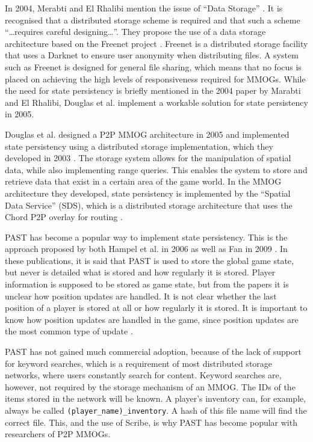 In 2004, Merabti and El Rhalibi mention the issue of ``Data Storage'' \cite{using_freenet_storage}. It is recognised that a distributed storage
scheme is required and that such a scheme ``\ldots requires careful designing\ldots''. They propose the use of a data storage architecture based on
the Freenet project \cite{clarke_freenet}. Freenet is a distributed storage facility that uses a Darknet to ensure user anonymity when distributing
files. A system such as Freenet is designed for general file sharing, which means that no focus is placed on achieving the high levels of
responsiveness required for MMOGs. While the need for state persistency is briefly mentioned in the 2004 paper by Marabti and El Rhalibi, Douglas et
al. implement a workable solution for state persistency in 2005.

Douglas et al. designed a P2P MMOG architecture in 2005 \cite{Douglas05enablingmassively} and implemented state persistency using a distributed
storage implementation, which they developed in 2003 \cite{Harwood03hashingspatial}. The storage system allows for the manipulation of spatial data,
while also implementing range queries. This enables the system to store and retrieve data that exist in a certain area of the game world. In the MMOG
architecture they developed, state persistency is implemented by the ``Spatial Data Service'' (SDS), which is a distributed storage architecture that
uses the Chord P2P overlay for routing \cite{chord}.

PAST has become a popular way to implement state persistency. This is the approach proposed by both Hampel et al. in 2006 \cite{past_storage_focus}
as well as Fan in 2009 \cite{Fan_phd}. In these publications, it is said that PAST is used to store the global game state, but never is detailed what
is stored and how regularly it is stored. Player information is supposed to be stored as game state, but from the papers it is unclear how position
updates are handled. It is not clear whether the last position of a player is stored at all or how regularly it is stored. It is important to know
how position updates are handled in the game, since position updates are the most common type of update \cite{knutsson_p2p_first}.

PAST has not gained much commercial adoption, because of the lack of support for keyword searches, which is a requirement of most distributed storage
networks, where users constantly search for content. Keyword searches are, however, not required by the storage mechanism of an MMOG. The IDs of the
items stored in the network will be known. A player's inventory can, for example, always be called \verb.(player_name)_inventory.. A hash of this
file name will find the correct file. This, and the use of Scribe, is why PAST has become popular with researchers of P2P MMOGs.

